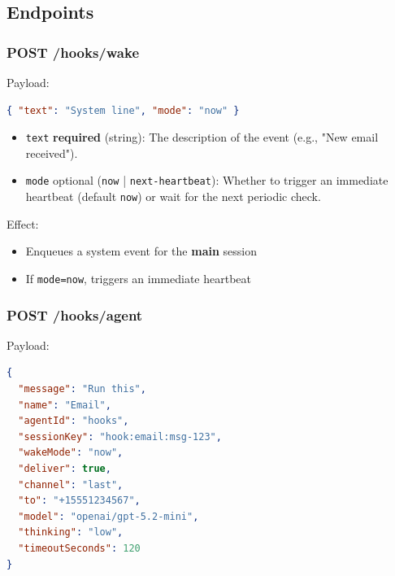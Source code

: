 \subsection{Endpoints}


\subsubsection{POST /hooks/wake}


Payload:

\begin{lstlisting}[language=json]
{ "text": "System line", "mode": "now" }
\end{lstlisting}


\begin{itemize}
  \item \texttt{text} \textbf{required} (string): The description of the event (e.g., "New email received").
  \item \texttt{mode} optional (\texttt{now} | \texttt{next-heartbeat}): Whether to trigger an immediate heartbeat (default \texttt{now}) or wait for the next periodic check.
\end{itemize}


Effect:

\begin{itemize}
  \item Enqueues a system event for the \textbf{main} session
  \item If \texttt{mode=now}, triggers an immediate heartbeat
\end{itemize}


\subsubsection{POST /hooks/agent}


Payload:

\begin{lstlisting}[language=json]
{
  "message": "Run this",
  "name": "Email",
  "agentId": "hooks",
  "sessionKey": "hook:email:msg-123",
  "wakeMode": "now",
  "deliver": true,
  "channel": "last",
  "to": "+15551234567",
  "model": "openai/gpt-5.2-mini",
  "thinking": "low",
  "timeoutSeconds": 120
}
\end{lstlisting}


